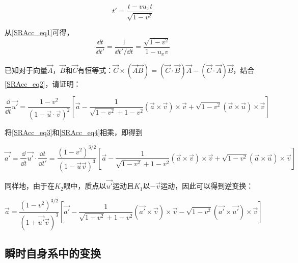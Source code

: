 \begin{equation}\label{SRAcc_eq1}
t'=\frac{t-vu_xt}{\sqrt{1-v^2}}
\end{equation}

从\autoref{SRAcc_eq1}可得，
\begin{equation}\label{SRAcc_eq3}
\frac{\dd t}{\dd t'}=\frac{1}{\dd t'/\dd t}=\frac{\sqrt{1-v^2}}{1-u_xv}
\end{equation}

\begin{exercise}{}

已知对于向量$\vec{A}$，$\vec{B}$和$\vec{C}$有恒等式：$\vec{C}\times(\vec{A}\vec{B})=(\vec{C}\cdot\vec{B})\vec{A}-(\vec{C}\cdot\vec{A})\vec{B}$，结合\autoref{SRAcc_eq2}，请证明：

\begin{equation}\label{SRAcc_eq4}

\frac{\dd}{\dd t}\vec{u'}=\frac{1-v^2}{(1-\vec{u}\cdot\vec{v})^2}[\vec{a}-\frac{1}{\sqrt{1-v^2}+1-v^2}(\vec{a}\times\vec{v})\times\vec{v}+\sqrt{1-v^2}(\vec{a}\times\vec{u})\times\vec{v}]

\end{equation}

\end{exercise}

将\autoref{SRAcc_eq3}和\autoref{SRAcc_eq4}相乘，即得到

\begin{equation}

\vec{a'}=\frac{\dd}{\dd t}\vec{u'}\cdot\frac{\dd t}{\dd t'}=\frac{(1-v^2)^{3/2}}{(1-\vec{u}\vec{v})^3}[\vec{a}-\frac{1}{\sqrt{1-v^2}+1-v^2}(\vec{a}\times\vec{v})\times\vec{v}+\sqrt{1-v^2}(\vec{a}\times\vec{u})\times\vec{v}]

\end{equation}

同样地，由于在$K_2$眼中，质点以$\vec{u'}$运动且$K_1$以$-\vec{v}$运动，因此可以得到逆变换：

\begin{equation}\label{SRAcc_eq5}

\vec{a}=\frac{(1-v^2)^{3/2}}{(1+\vec{u'}\vec{v})^3}[\vec{a'}-\frac{1}{\sqrt{1-v^2}+1-v^2}(\vec{a'}\times\vec{v})\times\vec{v}-\sqrt{1-v^2}(\vec{a'}\times\vec{u'})\times\vec{v}]

\end{equation}


\subsection{瞬时自身系中的变换}


